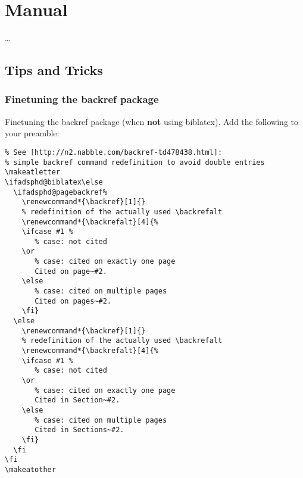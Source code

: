 \chapter{Manual}\label{ch:manual}


\ldots

\section{Tips and Tricks}


\subsection{Finetuning the backref package}

Finetuning the backref package (when \textbf{not} using biblatex). Add the
following to your preamble:

\begin{verbatim}
% See [http://n2.nabble.com/backref-td478438.html]:
% simple backref command redefinition to avoid double entries
\makeatletter
\ifadsphd@biblatex\else
  \ifadsphd@pagebackref%
    \renewcommand*{\backref}[1]{}
    % redefinition of the actually used \backrefalt 
    \renewcommand*{\backrefalt}[4]{% 
    \ifcase #1 % 
       % case: not cited 
    \or 
       % case: cited on exactly one page 
       Cited on page~#2.
    \else 
       % case: cited on multiple pages 
       Cited on pages~#2.
    \fi}
  \else
    \renewcommand*{\backref}[1]{}
    % redefinition of the actually used \backrefalt 
    \renewcommand*{\backrefalt}[4]{% 
    \ifcase #1 % 
       % case: not cited 
    \or 
       % case: cited on exactly one page 
       Cited in Section~#2.
    \else 
       % case: cited on multiple pages 
       Cited in Sections~#2.
    \fi}
  \fi
\fi
\makeatother
\end{verbatim}



\cleardoublepage

